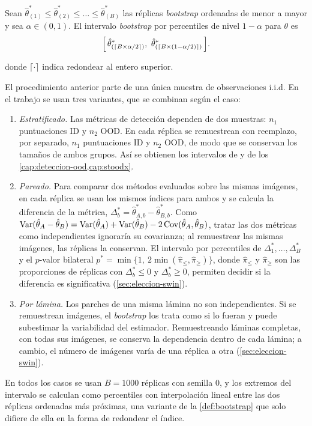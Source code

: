 \begin{definicion}\label{def:bootstrap}
Sean $\hat\theta^*_{(1)} \le \hat\theta^*_{(2)} \le \dots \le \hat\theta^*_{(B)}$ las réplicas
\emph{bootstrap} ordenadas de menor a mayor y sea $\alpha \in (0, 1)$. El intervalo \emph{bootstrap}
por percentiles de nivel $1 - \alpha$ para $\theta$ es
\[
  \Bigl[\, \hat\theta^*_{(\lceil B \times \alpha/2 \rceil)},\ \hat\theta^*_{(\lceil B \times (1-\alpha/2) \rceil)} \,\Bigr].
\]

donde $\lceil\cdot\rceil$ indica redondear al entero superior.   ~\cite{pena2008fundamentos}
\end{definicion}

\begin{observacion}\label{obs:bootstrap-variantes}
El procedimiento anterior parte de una única muestra de observaciones i.i.d. En el trabajo se usan tres variantes, que se combinan según el caso:
\begin{enumerate}
  \item \emph{Estratificado.} Las métricas de detección dependen de dos muestras: $n_1$ puntuaciones ID y $n_2$ OOD. En cada réplica se remuestrean con reemplazo, por separado, $n_1$ puntuaciones ID y $n_2$ OOD, de modo que se conservan los tamaños de ambos grupos. Así se obtienen los intervalos de \AUROC y  de los \cref{cap:deteccion-ood,cap:stoodx}.
  \item \emph{Pareado.} Para comparar dos métodos evaluados sobre las mismas imágenes, en cada réplica se usan los mismos índices para ambos y se calcula la diferencia de la métrica, $\Delta^*_b = \hat\theta^*_{A,b} - \hat\theta^*_{B,b}$. Como $\operatorname{Var}(\hat\theta_A - \hat\theta_B) = \operatorname{Var}(\hat\theta_A) + \operatorname{Var}(\hat\theta_B) - 2\operatorname{Cov}(\hat\theta_A, \hat\theta_B)$, tratar las dos métricas como independientes ignoraría su covarianza; al remuestrear las mismas imágenes, las réplicas la conservan. El intervalo por percentiles de $\Delta^*_1, \dots, \Delta^*_B$ y el $p$-valor bilateral $p^* = \min\bigl\{1,\ 2\min(\hat\pi_{\le}, \hat\pi_{\ge})\bigr\}$, donde $\hat\pi_{\le}$ y $\hat\pi_{\ge}$ son las proporciones de réplicas con $\Delta^*_b \le 0$ y $\Delta^*_b \ge 0$, permiten decidir si la diferencia es significativa (\cref{sec:eleccion-swin}).
  \item \emph{Por lámina.} Los parches de una misma lámina no son independientes. Si se remuestrean imágenes, el \emph{bootstrap} los trata como si lo fueran y puede subestimar la variabilidad del estimador. Remuestreando láminas completas, con todas sus imágenes, se conserva la dependencia dentro de cada lámina; a cambio, el número de imágenes varía de una réplica a otra (\cref{sec:eleccion-swin}).
\end{enumerate}
En todos los casos se usan $B = \num{1000}$ réplicas con semilla 0, y los extremos del intervalo se calculan como percentiles con interpolación lineal entre las dos réplicas ordenadas más próximas, una variante de la \cref{def:bootstrap} que solo difiere de ella en la forma de redondear el índice.
\end{observacion}
